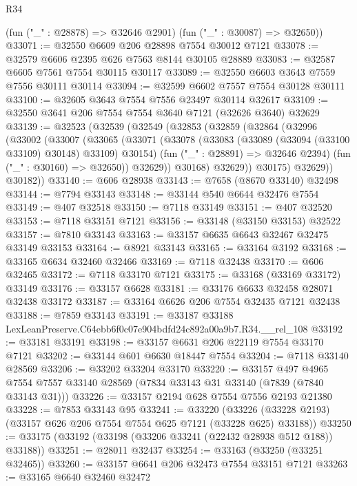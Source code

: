 \begin{lexlean}{R34}
\begin{coremodule}
      (fun ("_" : @28878) => @32646 @2901)
      (fun ("_" : @30087) => @32650))
@33071 := @32550 @6609 @206 @28898 @7554 @30012 @7121
@33078 := @32579 @6606 @2395 @626 @7563 @8144 @30105 @28889
@33083 := @32587 @6605 @7561 @7554 @30115 @30117
@33089 := @32550 @6603 @3643 @7559 @7556 @30111 @30114
@33094 := @32599 @6602 @7557 @7554 @30128 @30111
@33100 := @32605 @3643 @7554 @7556 @23497 @30114 @32617
@33109 := @32550 @3641 @206 @7554 @7554 @3640 @7121 (@32626 @3640) @32629
@33139 := @32523
    (@32539
      (@32549
        (@32853
          (@32859
            (@32864
              (@32996
                (@33002
                  (@33007
                    (@33065
                      (@33071
                        (@33078
                          (@33083 (@33089 (@33094 (@33100 @33109) @30148) @33109) @30154)
                          (fun ("_" : @28891) => @32646 @2394)
                          (fun ("_" : @30160) => @32650))
                        @32629))
                    @30168)
                  @32629))
              @30175)
            @32629))
        @30182))
@33140 := @606 @28938
@33143 := @7658 (@8670 @33140) @32498
@33144 := @7794 @33143
@33148 := @33144 @540 @6644 @32476 @7554
@33149 := @407 @32518
@33150 := @7118 @33149
@33151 := @407 @32520
@33153 := @7118 @33151 @7121
@33156 := @33148 (@33150 @33153) @32522
@33157 := @7810 @33143
@33163 := @33157 @6635 @6643 @32467 @32475 @33149 @33153
@33164 := @8921 @33143
@33165 := @33164 @3192
@33168 := @33165 @6634 @32460 @32466
@33169 := @7118 @32438
@33170 := @606 @32465
@33172 := @7118 @33170 @7121
@33175 := @33168 (@33169 @33172) @33149
@33176 := @33157 @6628
@33181 := @33176 @6633 @32458 @28071 @32438 @33172
@33187 := @33164 @6626 @206 @7554 @32435 @7121 @32438
@33188 := @7859 @33143
@33191 := @33187 @33188 LexLeanPreserve.C64ebb6f0c07e904bdfd24c892a00a9b7.R34.__rel_108
@33192 := @33181 @33191
@33198 := @33157 @6631 @206 @22119 @7554 @33170 @7121
@33202 := @33144 @601 @6630 @18447 @7554
@33204 := @7118 @33140 @28569
@33206 := @33202 @33204 @33170
@33220 := @33157
    @497
    @4965
    @7554
    @7557
    @33140
    @28569
    (@7834 @33143 @31 @33140 (@7839 (@7840 @33143 @31)))
@33226 := @33157 @2194 @628 @7554 @7556 @2193 @21380
@33228 := @7853 @33143 @95
@33241 := @33220
    (@33226 (@33228 @2193) (@33157 @626 @206 @7554 @7554 @625 @7121 (@33228 @625) @33188))
@33250 := @33175 (@33192 (@33198 (@33206 @33241 (@22432 @28938 @512 @188)) @33188))
@33251 := @28011 @32437
@33254 := @33163 (@33250 (@33251 @32465))
@33260 := @33157 @6641 @206 @32473 @7554 @33151 @7121
@33263 := @33165 @6640 @32460 @32472

\end{coremodule}
\end{lexlean}
